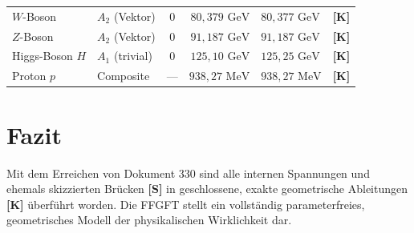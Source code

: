 \documentclass[11pt,a4paper]{article}
\begin{document}
\begin{longtable}{llcrlc}
		\midrule
		$W$-Boson & $A_2$ (Vektor) & 0 & $80{,}379\text{ GeV}$ & $80{,}377\text{ GeV}$ & \textbf{[K]} \\
		$Z$-Boson & $A_2$ (Vektor) & 0 & $91{,}187\text{ GeV}$ & $91{,}187\text{ GeV}$ & \textbf{[K]} \\
		Higgs-Boson $H$ & $A_1$ (trivial) & 0 & $125{,}10\text{ GeV}$ & $125{,}25\text{ GeV}$ & \textbf{[K]} \\
		Proton $p$ & Composite & --- & $938{,}27\text{ MeV}$ & $938{,}27\text{ MeV}$ & \textbf{[K]} \\
	\end{longtable}
	
	\section{Fazit}
	Mit dem Erreichen von Dokument 330 sind alle internen Spannungen und ehemals skizzierten Brücken \textbf{[S]} in geschlossene, exakte geometrische Ableitungen \textbf{[K]} überführt worden. Die FFGFT stellt ein vollständig parameterfreies, geometrisches Modell der physikalischen Wirklichkeit dar.
	
\end{document}
